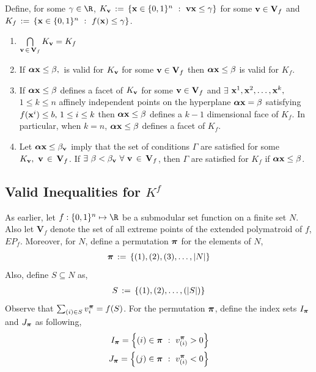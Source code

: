 \documentclass[10pt,twoside]{amsart}
\begin{document}
\begin{cor}
  Define, for some $\gamma \in \R$, $K_{\mathbf{v}} \,:=\, \left\{ {\mathbf{x} \in \{0,1\}^n} \ : \ {\mathbf{v} \mathbf{x} \leq \gamma} \right\}$ for some $\mathbf{v} \in \mathbf{V}_f$ and $K_{f} \,:=\, \left\{ {\mathbf{x} \in \{0,1\}^n} \ : \ {f(\mathbf{x}) \leq \gamma} \right\}$.
  \begin{enumerate}[label=\emph(\roman{*})]
    \item $\underset{\mathbf{v}\,\in\, \mathbf{V}_f}{\bigcap}\, K_{\mathbf{v}} = K_f$
    \item If $\boldsymbol\alpha \mathbf{x} \leq \beta,\,$ is valid for $K_{\mathbf{v}}$ for some $\mathbf{v} \in \mathbf{V}_f$ then $\boldsymbol\alpha \mathbf{x} \leq \beta$ is valid for $K_{f}$.
    \item If $\boldsymbol\alpha \mathbf{x} \leq \beta$ defines a facet of $K_{\mathbf{v}}$ for some $\mathbf{v} \in \mathbf{V}_f$ and $\exists$ $\mathbf{x}^1, \mathbf{x}^2, \ldots, \mathbf{x}^k,$ $1\leq k \leq n$ affinely independent points on the hyperplane $\boldsymbol\alpha \mathbf{x} = \beta$ satisfying $f(\mathbf{x}^i) \leq b,\,1\leq i \leq k$ then $\boldsymbol\alpha \mathbf{x} \leq \beta$ defines a $k-1$ dimensional face of $K_f$. In particular, when $k=n$, $\boldsymbol\alpha \mathbf{x} \leq \beta$ defines a facet of $K_f$.
    \item Let $\boldsymbol\alpha\mathbf{x} \leq \beta_{\mathbf{v}}$ imply that the set of conditions $\Gamma$ are satisfied for some $K_{\mathbf{v}},\,\, \mathbf{v} \,\in\, \mathbf{V}_f$. If $\exists\,\, \beta < \beta_{\mathbf{v}}\,\,\forall\,\,\mathbf{v} \,\in\, \mathbf{V}_f$, then $\Gamma$ are satisfied for $K_{f}$ if $\boldsymbol\alpha\mathbf{x} \leq \beta$.
  \end{enumerate}
\end{cor}

\subsection{Valid Inequalities for $K^f$}\hfill

As earlier, let $f : \binset^n \mapsto \R$ be a submodular set function on a finite set $N$. Also let $\mathbf{V}_f$ denote the set of all extreme points of the extended polymatroid of $f$, $EP_f$. Moreover, for $N$, define a permutation $\boldsymbol\pi$ for the elements of $N$,
$$
    \boldsymbol\pi \,:=\, \{(1), (2), (3),\ldots, |N|\}
$$
Also, define $S\subseteq N$ as,
\begin{align}
    S \,:=\, \{(1), (2), \ldots, (|S|)\}
\end{align}
Observe that $\sum_{(i) \in S} v^{\boldsymbol\pi}_i = f(S)$. For the permutation $\boldsymbol\pi$, define the index sets $I_{\boldsymbol\pi}$ and $J_{\boldsymbol\pi}$ as following,
\begin{align*}
  I_{\boldsymbol\pi} = \left\{ {(i)\in \boldsymbol\pi} \ : \ {v^{\boldsymbol\pi}_{(i)} > 0} \right\}\\
  J_{\boldsymbol\pi} = \left\{ {(j) \in \boldsymbol\pi} \ : \ {v^{\boldsymbol\pi}_{(i)} < 0} \right\}
\end{align*}
\end{document}
